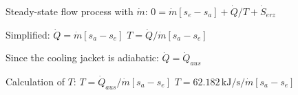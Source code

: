 Steady-state flow process with \( \dot{m} \):  
\( 0 = \dot{m} [s_e - s_a] + \dot{Q} / T + \dot{S}_{erz} \)  

Simplified:  
\( \dot{Q} = \dot{m} [s_a - s_e] \)  
\( T = \dot{Q} / \dot{m} [s_a - s_e] \)  

Since the cooling jacket is adiabatic:  
\( \dot{Q} = \dot{Q}_{aus} \)  

Calculation of \( T \):  
\( T = \dot{Q}_{aus} / \dot{m} [s_a - s_e] \)  
\( T = 62.182 \, \text{kJ/s} / \dot{m} [s_a - s_e] \)